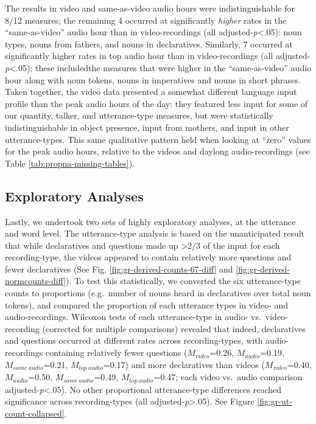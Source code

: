 \documentclass[man]{apa6}
\theoremstyle{definition}
\theoremstyle{definition}
\theoremstyle{definition}
\theoremstyle{remark}
\begin{document}
The results in video and same-as-video audio hours were
indistinguishable for 8/12 measures; the remaining 4 occurred at
significantly \emph{higher} rates in the \enquote{same-as-video} audio
hour than in video-recordings (all adjusted-\emph{p}\textless{}.05):
noun types, nouns from fathers, and nouns in declaratives. Similarly, 7
occurred at significantly higher rates in top audio hour than in
video-recordings (all adjusted-\emph{p}\textless{}.05); these
includedthe measures that were higher in the \enquote{same-as-video}
audio hour along with noun tokens, nouns in imperatives and nouns in
short phrases. Taken together, the video data presented a somewhat
different language input profile than the peak audio hours of the day:
they featured less input for some of our quantity, talker, and
utterance-type measures, but were statistically indistinguishable in
object presence, input from mothers, and input in other utterance-types.
This same qualitative pattern held when looking at \enquote{zero} values
for the peak audio hours, relative to the videos and daylong
audio-recordings (see Table \ref{tab:propna-missing-tables}).

\subsection{Exploratory Analyses}\label{exploratory-analyses}

Lastly, we undertook two sets of highly exploratory analyses, at the
utterance and word level. The utterance-type analysis is based on the
unanticipated result that while declaratives and questions made up
\textgreater{}2/3 of the input for each recording-type, the videos
appeared to contain relatively more questions and fewer declaratives
(See Fig. \ref{fig:gr-derived-counts-67-diff} and
\ref{fig:gr-derived-normcounts-diff}). To test this statistically, we
converted the six utterance-type counts to proportions (e.g.~number of
nouns heard in declaratives over total noun tokens), and compared the
proportion of each utterance types in video- and audio-recordings.
Wilcoxon tests of each utterance-type in audio- vs.~video-recording
(corrected for multiple comparisons) revealed that indeed, declaratives
and questions occurred at different rates across recording-types, with
audio-recordings containing relatively fewer questions
(\(M_{video}\)=0.26, \(M_{audio}\)=0.19, \(M_{same\  audio}\)=0.21,
\(M_{top\  audio}\)=0.17) and more declaratives than videos
(\(M_{video}\)=0.40, \(M_{audio}\)=0.50, \(M_{same\  audio}\)=0.49,
\(M_{top\ audio}\)=0.47; each video vs.~audio comparison
adjusted-\emph{p}\textless{}.05). No other proportional utterance-type
differences reached significance across recording-types (all
adjusted-\emph{p}\textgreater{}.05). See Figure
\ref{fig:gr-ut-count-collapsed}.
\end{document}
